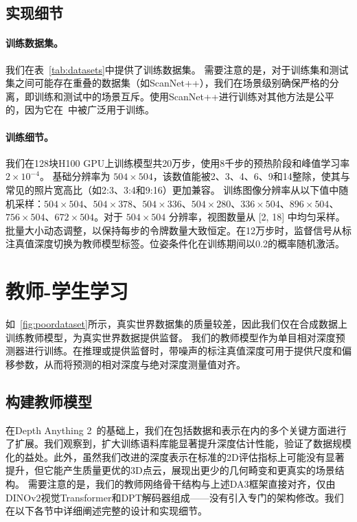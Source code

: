 \subsection{实现细节}

\paragraph{训练数据集。}
我们在表~\ref{tab:datasets}中提供了训练数据集。
需要注意的是，对于训练集和测试集之间可能存在重叠的数据集（如ScanNet++），我们在场景级别确保严格的分离，即训练和测试中的场景互斥。使用ScanNet++进行训练对其他方法是公平的，因为它在~\cite{wang2025vggt,dust3r}中被广泛用于训练。


\paragraph{训练细节。}
我们在128块H100 GPU上训练模型共20万步，使用8千步的预热阶段和峰值学习率 $2 \times10^{-4}$。
基础分辨率为 $504\times504$，该数值能被2、3、4、6、9和14整除，使其与常见的照片宽高比（如2:3、3:4和9:16）更加兼容。
训练图像分辨率从以下值中随机采样：$504\times504$、$504\times378$、$504\times336$、$504\times280$、$336\times504$、$896\times504$、$756\times504$、$672\times504$。对于 $504\times504$ 分辨率，视图数量从 [2, 18] 中均匀采样。批量大小动态调整，以保持每步的令牌数量大致恒定。在12万步时，监督信号从标注真值深度切换为教师模型标签。位姿条件化在训练期间以0.2的概率随机激活。







\section{教师-学生学习}

如~\cref{fig:poordataset}所示，真实世界数据集的质量较差，因此我们仅在合成数据上训练教师模型，为真实世界数据提供监督。
我们的教师模型作为单目相对深度预测器进行训练。在推理或提供监督时，带噪声的标注真值深度可用于提供尺度和偏移参数，从而将预测的相对深度与绝对深度测量值对齐。

\subsection{构建教师模型} \label{sec:teacher}

在Depth Anything 2~\cite{yang2024depth}的基础上，我们在包括数据和表示在内的多个关键方面进行了扩展。我们观察到，扩大训练语料库能显著提升深度估计性能，验证了数据规模化的益处。此外，虽然我们改进的深度表示在标准的2D评估指标上可能没有显著提升，但它能产生质量更优的3D点云，展现出更少的几何畸变和更真实的场景结构。
需要注意的是，我们的教师网络骨干结构与上述DA3框架直接对齐，仅由DINOv2视觉Transformer和DPT解码器组成——没有引入专门的架构修改。我们在以下各节中详细阐述完整的设计和实现细节。


